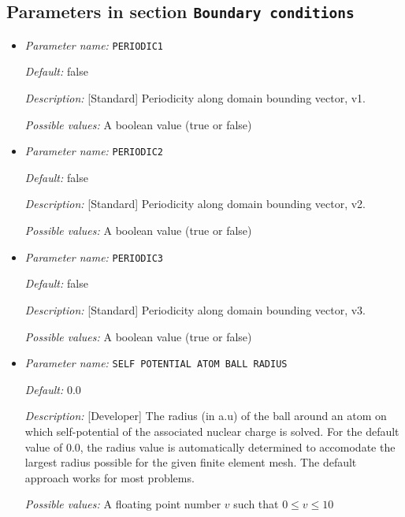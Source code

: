 \subsection{Parameters in section \tt Boundary conditions}
\label{parameters:Boundary_20conditions}

\begin{itemize}
\item {\it Parameter name:} {\tt PERIODIC1}
\label{parameters:Boundary conditions/PERIODIC1}
\label{parameters:Boundary_20conditions/PERIODIC1}




{\it Default:} false


{\it Description:} [Standard] Periodicity along domain bounding vector, v1.


{\it Possible values:} A boolean value (true or false)
\item {\it Parameter name:} {\tt PERIODIC2}
\label{parameters:Boundary conditions/PERIODIC2}
\label{parameters:Boundary_20conditions/PERIODIC2}




{\it Default:} false


{\it Description:} [Standard] Periodicity along domain bounding vector, v2.


{\it Possible values:} A boolean value (true or false)
\item {\it Parameter name:} {\tt PERIODIC3}
\label{parameters:Boundary conditions/PERIODIC3}
\label{parameters:Boundary_20conditions/PERIODIC3}




{\it Default:} false


{\it Description:} [Standard] Periodicity along domain bounding vector, v3.


{\it Possible values:} A boolean value (true or false)
\item {\it Parameter name:} {\tt SELF POTENTIAL ATOM BALL RADIUS}
\label{parameters:Boundary conditions/SELF POTENTIAL ATOM BALL RADIUS}
\label{parameters:Boundary_20conditions/SELF_20POTENTIAL_20ATOM_20BALL_20RADIUS}




{\it Default:} 0.0


{\it Description:} [Developer] The radius (in a.u) of the ball around an atom on which self-potential of the associated nuclear charge is solved. For the default value of 0.0, the radius value is automatically determined to accomodate the largest radius possible for the given finite element mesh. The default approach works for most problems.


{\it Possible values:} A floating point number $v$ such that $0 \leq v \leq 10$
\end{itemize}

